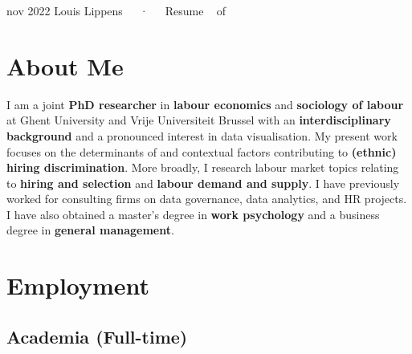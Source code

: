 \documentclass[11pt,a4paper,]{awesome-cv}
\begin{document}
\makecvheader

\makecvfooter
  {nov 2022}
    {Louis Lippens~~~·~~~Resume}
  {\thepage~ of \pageref{LastPage}~}





\hypertarget{about-me}{%
\section{About Me}\label{about-me}}

\footnotesize

I am a joint \textbf{PhD researcher} in \textbf{labour economics} and
\textbf{sociology of labour} at Ghent University and Vrije Universiteit
Brussel with an \textbf{interdisciplinary background} and a pronounced
interest in data visualisation. My present work focuses on the
determinants of and contextual factors contributing to \textbf{(ethnic)
hiring discrimination}. More broadly, I research labour market topics
relating to \textbf{hiring and selection} and \textbf{labour demand and
supply}. I have previously worked for consulting firms on data
governance, data analytics, and HR projects. I have also obtained a
master's degree in \textbf{work psychology} and a business degree in
\textbf{general management}. \normalsize

\hypertarget{employment}{%
\section{Employment}\label{employment}}

\medskip

\hypertarget{academia-full-time}{%
\subsection{Academia (Full-time)}\label{academia-full-time}}
\end{document}
